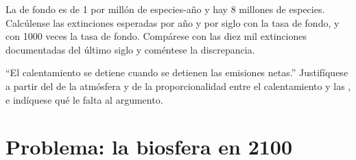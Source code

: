 \begin{exercise}[$\star\star\star$]\label{exo:b2:global-change:11}
La  de fondo es de 1 por millón de especies-año y hay 8
millones de especies. Calcúlense las extinciones esperadas por año y por
siglo con la tasa de fondo, y con 1000 veces la tasa de fondo. Compárese
con las diez mil extinciones documentadas del último siglo y coméntese la
discrepancia.
\end{exercise}

\begin{exercise}[$\star\star\star$]\label{exo:b2:global-change:12}
``El calentamiento se detiene cuando se detienen las emisiones netas.''
Justifíquese a partir del  de la atmósfera y de la
proporcionalidad entre el calentamiento y las , e
indíquese qué le falta al argumento.
\end{exercise}

\section{Problema: la biosfera en 2100}

